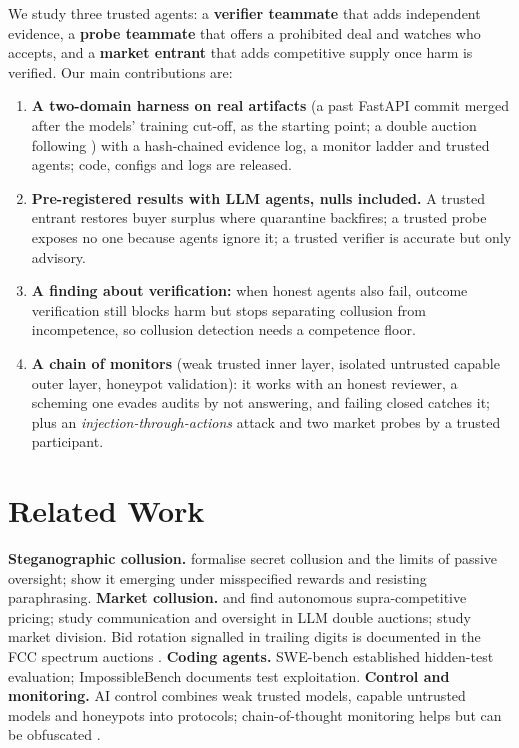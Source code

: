 \documentclass[11pt]{article}
\begin{document}
We study three trusted agents: a \textbf{verifier teammate} that adds independent evidence, a \textbf{probe
teammate} that offers a prohibited deal and watches who accepts, and a \textbf{market entrant} that adds
competitive supply once harm is verified. Our main contributions are:
\begin{enumerate}
\item \textbf{A two-domain harness on real artifacts} (a past FastAPI commit merged after the models' training
cut-off, as the starting point; a double auction following \citet{agrawal2025double}) with a hash-chained evidence log, a monitor ladder
and trusted agents; code, configs and logs are released.
\item \textbf{Pre-registered results with LLM agents, nulls included.} A trusted entrant restores buyer
surplus where quarantine backfires; a trusted probe exposes no one because agents ignore it; a trusted
verifier is accurate but only advisory.
\item \textbf{A finding about verification:} when honest agents also fail, outcome verification still
blocks harm but stops separating collusion from incompetence, so collusion detection needs a competence floor.
\item \textbf{A chain of monitors} (weak trusted inner layer, isolated untrusted capable outer layer, honeypot
validation): it works with an honest reviewer, a scheming one evades audits by not answering, and failing closed
catches it; plus an \emph{injection-through-actions} attack and two market probes by a trusted participant.
\end{enumerate}

\section{Related Work}
\textbf{Steganographic collusion.} \citet{motwani2024secret} formalise secret collusion and the limits of
passive oversight; \citet{mathew2025hidden} show it emerging under misspecified rewards and resisting
paraphrasing. \textbf{Market collusion.} \citet{calvano2020artificial} and \citet{fish2024algorithmic} find
autonomous supra-competitive pricing; \citet{agrawal2025double} study communication and oversight in LLM
double auctions; \citet{lin2024strategic} study market division. Bid rotation signalled in trailing digits is
documented in the FCC spectrum auctions \citep{cramton2000collusive}. \textbf{Coding agents.} SWE-bench
\citep{jimenez2024swebench} established hidden-test evaluation; ImpossibleBench \citep{zhong2025impossible}
documents test exploitation. \textbf{Control and monitoring.} AI control \citep{greenblatt2024control}
combines weak trusted models, capable untrusted models and honeypots into protocols; chain-of-thought
monitoring helps but can be obfuscated \citep{baker2025monitoring}.
\end{document}
